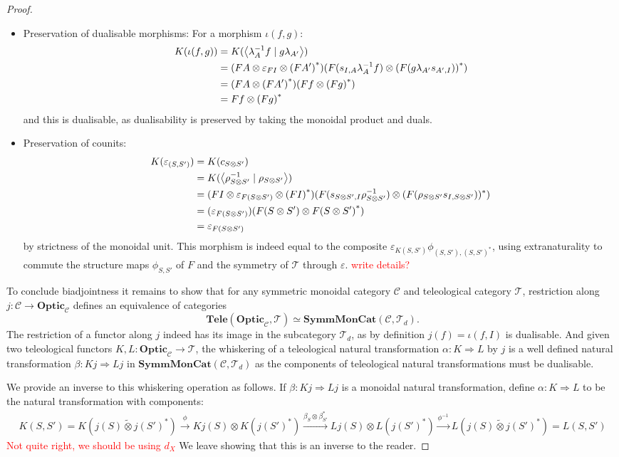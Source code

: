 \documentclass[11pt,letterpaper]{article}
\theoremstyle{plain}
\theoremstyle{definition}
\newcommand{\C}{\mathscr{C}}
\newcommand{\T}{\mathscr{T}}
\newcommand{\SymmMonCat}{\mathbf{SymmMonCat}}
\newcommand{\Tele}{\mathbf{Tele}}
\newcommand{\Optic}{\mathbf{Optic}}
\newcommand{\switched}{\mathbin{\tilde{\otimes}}}
\newcommand{\rep}[2]{{\ensuremath \left\langle #1 \mid #2 \right\rangle}}
\newcommand{\todo}[1]{\textcolor{red}{\small #1}}
\begin{document}
\begin{proof}
\begin{itemize}
\item Preservation of dualisable morphisms:  For a morphism $\iota(f, g)$:
\begin{align*}
K(\iota(f, g))
    &= K(\rep{\lambda_A^{-1} f}{g \lambda_{A'}}) \\
    &= (FA \otimes \varepsilon_{FI} \otimes {(FA')}^*)(F(s_{I,A}\lambda_A^{-1} f) \otimes {(F(g \lambda_{A'}s_{A', I}))}^* ) \\
    &= (FA \otimes {(FA')}^*)(Ff \otimes {(Fg)}^* ) \\
    &= Ff \otimes {(Fg)}^*
\end{align*}
and this is dualisable, as dualisability is preserved by taking the monoidal product and duals.
\item Preservation of counits:
\begin{align*}
K(\varepsilon_{(S, S')})
&= K(c_{S \otimes S'}) \\
&= K(\rep{\rho_{S \otimes S'}^{-1}}{\rho_{S \otimes S'}}) \\
&= (FI \otimes \varepsilon_{F(S \otimes S')} \otimes {(FI)}^*)(F(s_{S \otimes S',I}\rho_{S \otimes S'}^{-1}) \otimes (F(\rho_{S \otimes S'} s_{I, S \otimes S'}))^* ) \\
&= (\varepsilon_{F(S \otimes S')})(F(S \otimes S') \otimes F{(S \otimes S')}^* ) \\
&= \varepsilon_{F(S \otimes S')}
\end{align*}
by strictness of the monoidal unit. This morphism is indeed equal to the composite $\varepsilon_{K(S, S')} \phi_{(S, S'), {(S, S')}^*}$, using extranaturality to commute the structure maps $\phi_{S, S'}$ of $F$ and the symmetry of $\T$ through $\varepsilon$. \todo{write details?}
\end{itemize}

To conclude biadjointness it remains to show that for any symmetric monoidal category $\C$ and teleological category $\T$, restriction along $j : \C \to \Optic_\C$ defines an equivalence of categories \[\Tele(\Optic_\C, \T) \simeq \SymmMonCat(\C, \T_d). \]
The restriction of a functor along $j$ indeed has its image in the subcategory $\T_d$, as by definition $j(f) = \iota(f, I)$ is dualisable. And given two teleological functors $K, L : \Optic_\C \to \T$, the whiskering of a teleological natural transformation $\alpha : K \Rightarrow L$ by $j$ is a well defined natural transformation $\beta : K j \Rightarrow L j$ in $\SymmMonCat(\C, \T_d)$ as the components of teleological natural transformations must be dualisable.

We provide an inverse to this whiskering operation as follows. If $\beta : K j \Rightarrow L j$ is a monoidal natural transformation, define $\alpha : K \Rightarrow L$ to be the natural transformation with components:
\begin{align*}
K(S, S') = K(j(S) \switched {j(S')}^*) \xrightarrow{\phi} Kj(S) \otimes K({j(S')}^*) \xrightarrow{\beta_S \otimes \beta_{S'}^*} Lj(S) \otimes L({j(S')}^*) \xrightarrow{\phi^{-1}} L(j(S) \switched {j(S')}^*) = L(S, S')
\end{align*}
\todo{Not quite right, we should be using $d_X$} We leave showing that this is an inverse to the reader.
\end{proof}
\end{document}
